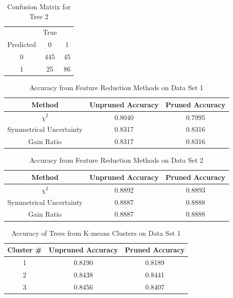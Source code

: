 \documentclass[conference,compsoc]{IEEEtran}
\begin{document}
\begin{table}[!t]
\renewcommand{\arraystretch}{1.3}
\caption{Confusion Matrix for Tree 2}
\label{table.confusion.matrix.02}
\centering
\begin{tabular}{ccc}
\hline
 & True &  \\
Predicted & 0 & 1 \\
0 & 445 & 45 \\
1 & 25 & 86 \\
\hline
\end{tabular}
\end{table}

\begin{table}[!t]
\renewcommand{\arraystretch}{1.3}
\caption{Accuracy from Feature Reduction Methods on Data Set 1}
\label{table.feature.reduction.accuracy.01}
\centering
\begin{tabular}{ccc}
\hline
Method & Unpruned Accuracy & Pruned Accuracy \\
\hline 
${\chi}^2$ & 0.8040 & 0.7995 \\
Symmetrical Uncertainty & 0.8317 & 0.8316 \\
Gain Ratio & 0.8317 & 0.8316 \\
\hline
\end{tabular}
\end{table}

\begin{table}[!t]
\renewcommand{\arraystretch}{1.3}
\caption{Accuracy from Feature Reduction Methods on Data Set 2}
\label{table.feature.reduction.accuracy.02}
\centering
\begin{tabular}{ccc}
\hline
Method & Unpruned Accuracy & Pruned Accuracy \\
\hline 
${\chi}^2$ & 0.8892 & 0.8893 \\
Symmetrical Uncertainty & 0.8887 & 0.8888 \\
Gain Ratio & 0.8887 & 0.8888 \\
\hline
\end{tabular}
\end{table}

\begin{table}[!t]
\renewcommand{\arraystretch}{1.3}
\caption{Accuracy of Trees from K-means Clusters on Data Set 1}
\label{table.kmeans.accuracy.01}
\centering
\begin{tabular}{ccc}
\hline
Cluster \# & Unpruned Accuracy & Pruned Accuracy \\
\hline 
1 & 0.8190 & 0.8189 \\
2 & 0.8438 & 0.8441 \\
3 & 0.8456 & 0.8407 \\
\hline
\end{tabular}
\end{table}
\end{document}
